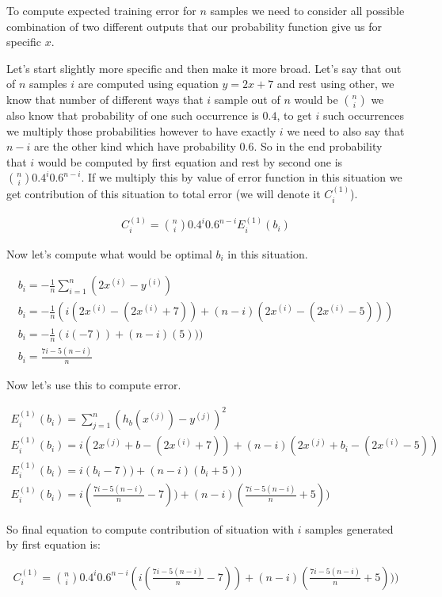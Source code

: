 \documentclass[a4paper]{article}
\begin{document}
To compute expected training error for $n$ samples we need to consider all possible combination of two different outputs that our probability function give us for specific $x$.

Let's start slightly more specific and then make it more broad. Let's say that out of $n$ samples $i$ are computed using equation $y=2x+7$ and rest using other, we know that number of different ways that $i$ sample out of $n$ would be $\binom{n}{i}$ we also know that probability of one such occurrence is $0.4$, to get $i$ such occurrences we multiply those probabilities however to have exactly $i$ we need to also say that $n-i$ are the other kind which have probability $0.6$. So in the end probability that $i$ would be computed by first equation and rest by second one is $\binom{n}{i}0.4^i0.6^{n-i}$. If we multiply this by value of error function in this situation we get contribution of this situation to total error (we will denote it $C_i^{(1)}$).

\begin{align*}
	C_i^{(1)} = \binom{n}{i}0.4^i0.6^{n-i}E_i^{(1)}(b_i)
\end{align*}  

Now let's compute what would be optimal $b_i$ in this situation.

\begin{align*}
	b_i = - \frac{1}{n}\sum_{i=1}^{n}(2x^{(i)} - y^{(i)})
	\\
	b_i = - \frac{1}{n}(i(2x^{(i)} - (2x^{(i)}+7)) + (n-i)(2x^{(i)} - (2x^{(i)}-5)))
	\\
	b_i = - \frac{1}{n}(i(-7)) + (n-i)(5)))
	\\
	b_i = \frac{7i-5(n-i)}{n}
\end{align*}

Now let's use this to compute error.

\begin{align*}
	E_i^{(1)}(b_i)=\sum_{j=1}^{n}(h_b(x^{(j)}) - y^{(j)})^2 
	\\
	E_i^{(1)}(b_i)=i(2x^{(j)} + b - (2x^{(i)}+7)) + (n-i)(2x^{(j)} + b_i - (2x^{(i)}-5))
	\\
	E_i^{(1)}(b_i)=i(b_i-7)) + (n-i)(b_i +5))
	\\
	E_i^{(1)}(b_i)=i(\frac{7i-5(n-i)}{n}-7)) + (n-i)(\frac{7i-5(n-i)}{n} +5))
\end{align*} 

So final equation to compute contribution of situation with $i$ samples generated by first equation is:

\begin{align*}
	C_i^{(1)} = \binom{n}{i}0.4^i0.6^{n-i}(i(\frac{7i-5(n-i)}{n}-7)) + (n-i)(\frac{7i-5(n-i)}{n} +5)))
\end{align*}
\end{document}
